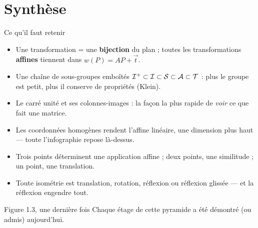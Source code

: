 \section{Synthèse}

\begin{frame}{Ce qu'il faut retenir}
  \begin{itemize}
    \item Une transformation = une \textbf{bijection} du plan ; toutes
      les transformations \textbf{affines} tiennent dans
      $w(P) = AP + \vec t$.
    \item Une chaîne de sous-groupes emboîtés
      $\mathcal{I}^+ \subset \mathcal{I} \subset \mathcal{S} \subset \mathcal{A} \subset \mathcal{T}$ :
      plus le groupe est petit, plus il conserve de propriétés (Klein).
    \item Le carré unité et ses colonnes-images : la façon la plus
      rapide de \emph{voir} ce que fait une matrice.
    \item Les coordonnées homogènes rendent l'affine linéaire, une
      dimension plus haut --- toute l'infographie repose là-dessus.
    \item Trois points déterminent une application affine ; deux
      points, une similitude ; un point, une translation.
    \item Toute isométrie est translation, rotation, réflexion ou
      réflexion glissée --- et la réflexion engendre tout.
  \end{itemize}
\end{frame}

\begin{frame}{Figure 1.3, une dernière fois}
  \small Chaque étage de cette pyramide a été démontré (ou admis)
  aujourd'hui.
\end{frame}

